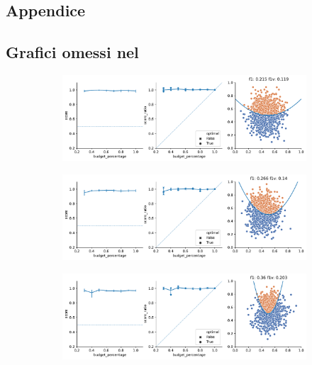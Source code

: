 
\begin{appendices}
\chapter*{Appendice}\label{appendix}
\section*{Grafici omessi nel~}
\begin{figure}[!ht]
    \begin{subfigure}{.4999\textwidth}
        \centering
        \includegraphics[width=\textwidth]{img/2d/1.pdf}
    \end{subfigure}%
    \begin{subfigure}{.5\textwidth}
        \centering
        \includegraphics[width=\textwidth]{img/2d/2.pdf}
    \end{subfigure}%
    \hfill
    \begin{subfigure}{.5\textwidth}
        \centering
        \includegraphics[width=\textwidth]{img/2d/5.pdf}

\end{subfigure}
\end{figure}
\end{appendices}
